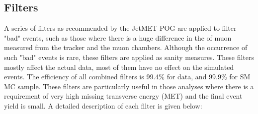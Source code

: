 \subsection{Filters}
A series of filters as recommended by the JetMET POG \cite{metFilters} are applied to
filter "bad" events, such as those where there is a huge difference in the \pt of
muon measured from the tracker and the muon chambers. Although the occurrence of such
"bad" events is rare, these filters are applied as sanity measures. These
filters mostly affect the actual data, most of them have no effect on the simulated
events. The efficiency of all combined filters is 99.4\% for data, and 99.9\%
for SM \ttjets MC sample. These filters are particularly useful in those
analyses where there is a requirement of very high missing transverse energy (MET)
and the final event yield is small. A detailed description of each filter is given
below:
